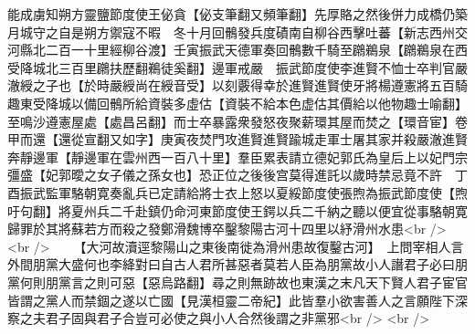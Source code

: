 能成虜知朔方靈鹽節度使王佖貪【佖支筆翻又頻筆翻】先厚賂之然後併力成橋仍築月城守之自是朔方禦寇不暇　冬十月回鶻發兵度磧南自柳谷西擊吐蕃【新志西州交河縣北二百一十里經柳谷渡】壬寅振武天德軍奏回鶻數千騎至鸊鵜泉【鸊鵜泉在西受降城北三百里鸊扶歷翻鵜徒奚翻】邊軍戒嚴　振武節度使李進賢不恤士卒判官嚴澈綬之子也【於時嚴綬尚在綬音受】以刻覈得幸於進賢進賢使牙將楊遵憲將五百騎趣東受降城以備回鶻所給資裝多虛估【資裝不給本色虚估其價給以他物趣士喻翻】至鳴沙遵憲屋處【處昌呂翻】而士卒暴露衆發怒夜聚薪環其屋而焚之【環音宦】卷甲而還【還從宣翻又如字】庚寅夜焚門攻進賢進賢踰城走軍士屠其家并殺嚴澈進賢奔靜邊軍【靜邊軍在雲州西一百八十里】羣臣累表請立德妃郭氏為皇后上以妃門宗彊盛【妃郭曖之女子儀之孫女也】恐正位之後後宫莫得進託以歲時禁忌竟不許　丁酉振武監軍駱朝寛奏亂兵已定請給將士衣上怒以夏綏節度使張煦為振武節度使【煦吁句翻】將夏州兵二千赴鎮仍命河東節度使王鍔以兵二千納之聽以便宜從事駱朝寛歸罪於其將蘇若方而殺之發鄭滑魏博卒鑿黎陽古河十四里以紓滑州水患<br />
<br />
　　【大河故瀆逕黎陽山之東後南徙為滑州患故復鑿古河】　上問宰相人言外間朋黨大盛何也李絳對曰自古人君所甚惡者莫若人臣為朋黨故小人譖君子必曰朋黨何則朋黨言之則可惡【惡烏路翻】尋之則無跡故也東漢之末凡天下賢人君子宦官皆謂之黨人而禁錮之遂以亡國【見漢桓靈二帝紀】此皆羣小欲害善人之言願陛下深察之夫君子固與君子合豈可必使之與小人合然後謂之非黨邪<br />
<br />
